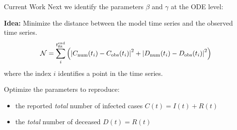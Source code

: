 \begin{slide}{Current Work}
	{\large Next we identify the parameters $\beta$ and $\gamma$ at the ODE level:} \\

	\vspace{.5cm}
	
	\textbf{Idea:} Minimize the distance between the model time series and the observed time series.
	\begin{equation*}
	\mathcal{N} = \sum_i^{t_\text{fit}^\text{end}} \left( \left| C_{\text{num}} (t_i) - C_{\text{obs}} (t_i) \right|^2 + \left| D_{\text{num}} (t_i) - D_{\text{obs}} (t_i) \right|^2 \right)
	\end{equation*}
	where the index $i$ identifies a point in the time series.\\
	
	\vspace{.5cm}
	
	Optimize the parameters to reproduce:
	\begin{itemize}
		\item the reported \emph{total} number of infected cases $C(t) = I(t) + R(t)$
		\item the \emph{total} number of deceased $D(t) = R(t)$
	\end{itemize}

\end{slide}